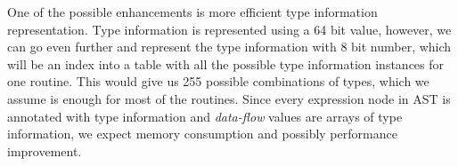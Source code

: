         One of the possible enhancements is more efficient 
        type information representation. Type information 
        is represented using a 64 bit value, however, 
        we can go even further and represent the type 
        information with 8 bit number, which will be an index 
        into a table with all the possible type information 
        instances for one routine. This would give us 255 
        possible combinations of types, which we assume is 
        enough for most of the routines. Since every expression 
        node in AST is annotated with type information and 
        \emph{data-flow} values are arrays of 
        type information, we expect memory consumption 
        and possibly performance improvement.
        
        